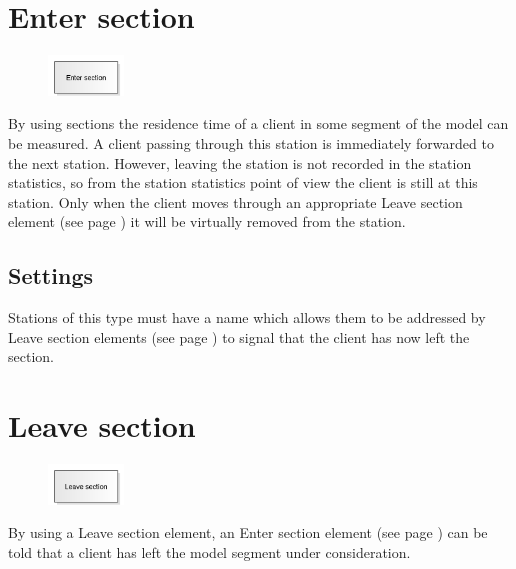 \section{Enter section}
\label{ref:ModelElementSectionStart}

\begin{figure}
\vspace{-22pt}
\includegraphics[width=2cm]{imageModelElementSectionStart.png}
\vspace{-22pt}
\end{figure}

By using sections the residence time of a client in some segment of the model can be measured.
A client passing through this station is immediately forwarded to the next station.
However, leaving the station is not recorded in the station statistics, so from the station
statistics point of view the client is still at this station. Only when the client moves through
an appropriate Leave section element (see page \pageref{ref:ModelElementSectionEnd}) it will be
virtually removed from the station.

\subsection*{Settings}

Stations of this type must have a name which allows them to be addressed by
Leave section elements (see page \pageref{ref:ModelElementSectionEnd}) to signal
that the client has now left the section.


\section{Leave section}
\label{ref:ModelElementSectionEnd}

\begin{figure}
\vspace{-22pt}
\includegraphics[width=2cm]{imageModelElementSectionEnd.png}
\vspace{-22pt}
\end{figure}

By using a Leave section element, an Enter section element (see page \pageref{ref:ModelElementSectionStart}) 
can be told that a client has left the model segment under consideration.

